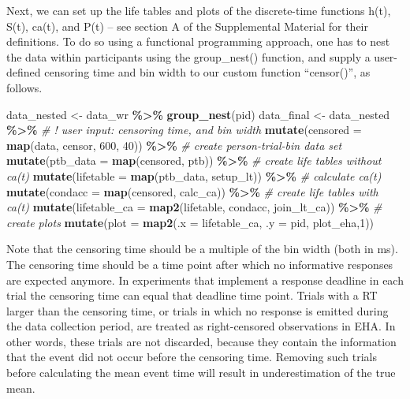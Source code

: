 \documentclass[
  man, donotrepeattitle,floatsintext]{apa6}
\newenvironment{Shaded}{\begin{snugshade}}{\end{snugshade}}
\newcommand{\AttributeTok}[1]{\textcolor[rgb]{0.13,0.29,0.53}{#1}}
\newcommand{\CommentTok}[1]{\textcolor[rgb]{0.56,0.35,0.01}{\textit{#1}}}
\newcommand{\DecValTok}[1]{\textcolor[rgb]{0.00,0.00,0.81}{#1}}
\newcommand{\FunctionTok}[1]{\textcolor[rgb]{0.13,0.29,0.53}{\textbf{#1}}}
\newcommand{\NormalTok}[1]{#1}
\newcommand{\OtherTok}[1]{\textcolor[rgb]{0.56,0.35,0.01}{#1}}
\newcommand{\SpecialCharTok}[1]{\textcolor[rgb]{0.81,0.36,0.00}{\textbf{#1}}}
\begin{document}
Next, we can set up the life tables and plots of the discrete-time functions h(t), S(t), ca(t), and P(t) -- see section A of the Supplemental Material for their definitions. To do so using a functional programming approach, one has to nest the data within participants using the group\_nest() function, and supply a user-defined censoring time and bin width to our custom function ``censor()'', as follows.

\footnotesize

\begin{Shaded}
\begin{Highlighting}[]
\NormalTok{data\_nested }\OtherTok{\textless{}{-}}\NormalTok{ data\_wr }\SpecialCharTok{\%\textgreater{}\%} \FunctionTok{group\_nest}\NormalTok{(pid)}
\NormalTok{data\_final }\OtherTok{\textless{}{-}}\NormalTok{ data\_nested }\SpecialCharTok{\%\textgreater{}\%} 
  \CommentTok{\# ! user input: censoring time, and bin width}
  \FunctionTok{mutate}\NormalTok{(}\AttributeTok{censored =} \FunctionTok{map}\NormalTok{(data, censor, }\DecValTok{600}\NormalTok{, }\DecValTok{40}\NormalTok{)) }\SpecialCharTok{\%\textgreater{}\%}   
  \CommentTok{\# create person{-}trial{-}bin data set}
  \FunctionTok{mutate}\NormalTok{(}\AttributeTok{ptb\_data =} \FunctionTok{map}\NormalTok{(censored, ptb)) }\SpecialCharTok{\%\textgreater{}\%}          
  \CommentTok{\# create life tables without ca(t)}
  \FunctionTok{mutate}\NormalTok{(}\AttributeTok{lifetable =} \FunctionTok{map}\NormalTok{(ptb\_data, setup\_lt)) }\SpecialCharTok{\%\textgreater{}\%}   
  \CommentTok{\# calculate ca(t)}
  \FunctionTok{mutate}\NormalTok{(}\AttributeTok{condacc =} \FunctionTok{map}\NormalTok{(censored, calc\_ca)) }\SpecialCharTok{\%\textgreater{}\%}      
  \CommentTok{\# create life tables with ca(t)}
  \FunctionTok{mutate}\NormalTok{(}\AttributeTok{lifetable\_ca =} \FunctionTok{map2}\NormalTok{(lifetable, condacc, join\_lt\_ca)) }\SpecialCharTok{\%\textgreater{}\%}    
  \CommentTok{\# create plots }
  \FunctionTok{mutate}\NormalTok{(}\AttributeTok{plot =} \FunctionTok{map2}\NormalTok{(}\AttributeTok{.x =}\NormalTok{ lifetable\_ca, }\AttributeTok{.y =}\NormalTok{ pid, plot\_eha,}\DecValTok{1}\NormalTok{))  }
\end{Highlighting}
\end{Shaded}

\normalsize

Note that the censoring time should be a multiple of the bin width (both in ms). The censoring time should be a time point after which no informative responses are expected anymore. In experiments that implement a response deadline in each trial the censoring time can equal that deadline time point. Trials with a RT larger than the censoring time, or trials in which no response is emitted during the data collection period, are treated as right-censored observations in EHA. In other words, these trials are not discarded, because they contain the information that the event did not occur before the censoring time. Removing such trials before calculating the mean event time will result in underestimation of the true mean.
\end{document}
